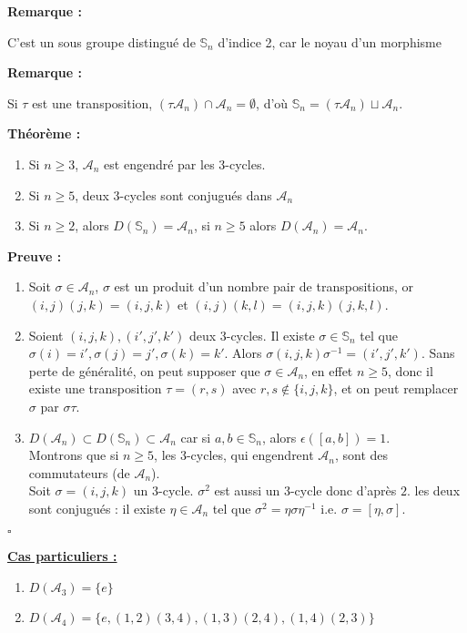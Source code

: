 \documentclass{report}
\renewenvironment{leftbar}{%
  \def\FrameCommand{\vrule width 0.4pt \hspace{10pt}}%
  \MakeFramed {\advance\hsize-\width \FrameRestore}}%
 {\endMakeFramed}%
\newenvironment{preuve}{\vspace*{0.5cm}
    \begin{leftbar}
    \noindent\textbf{Preuve :}\par}{
    \begin{flushright}
    $\square$
    \end{flushright}
    \end{leftbar}
}
\newenvironment{theoreme}[1][]{
    \begin{tcolorbox}[]
    \textbf{Théorème :} #1  \par} 
    {\end{tcolorbox}}
\newcommand{\remarque}{
    \noindent\textbf{Remarque :} \par
}
\newcommand{\sn}{\mathbb{S}_n}
\newcommand{\an}{\mathcal{A}_{n}}
\begin{document}
\remarque{C'est un sous groupe distingué de $\sn$ d'indice 2, car le noyau d'un morphisme}


\remarque{Si $\tau$ est une transposition, $(\tau\an)\cap\an=\emptyset$, d'où $\sn=(\tau\an)\sqcup\an$.}
\begin{theoreme}
\begin{enumerate}
\item Si $n\geq3$, $\an$ est engendré par les 3-cycles.
\item Si $n\geq5$, deux 3-cycles sont conjugués dans $\an$ 
\item Si $n\geq2$, alors $D(\sn)=\an$, si $n\geq5$ alors $D(\an)=\an$.
\end{enumerate}
\end{theoreme}

\begin{preuve}
\begin{enumerate}
\item Soit $\sigma\in\an$, $\sigma$ est un produit d'un nombre pair de transpositions, or $(i,j)(j,k)=(i,j,k)$ et $(i,j)(k,l)=(i,j,k)(j,k,l)$.
\item Soient $(i,j,k),(i',j',k')$ deux 3-cycles. Il existe $\sigma\in\sn$ tel que $\sigma(i)=i', \sigma(j)=j', \sigma(k)=k'$. Alors $\sigma(i,j,k)\sigma^{-1}=(i',j',k')$. 
Sans perte de généralité, on peut supposer que $\sigma\in\an$, en effet $n\geq5$, donc il existe une transposition $\tau=(r,s)$ avec $r,s\notin\{i,j,k\}$, et on peut remplacer $\sigma$ par $\sigma\tau$.
\item $D(\an)\subset D(\sn)\subset\an$ car si $a,b\in\sn$, alors $\epsilon([a,b])=1$.\\
Montrons que si $n\geq5$, les 3-cycles, qui engendrent $\an$, sont des commutateurs (de $\an$).\\
Soit $\sigma=(i,j,k)$ un 3-cycle. $\sigma^2$ est aussi un 3-cycle donc d'après $2.$ les deux sont conjugués : il existe $\eta\in\an$ tel que $\sigma^2=\eta\sigma\eta^{-1}$ i.e. $\sigma=[\eta,\sigma]$.
\end{enumerate}
\end{preuve}

\noindent\underline{\textbf{Cas particuliers :}}
\begin{enumerate}
\item $D(\mathcal{A}_3)=\{e\}$
\item $D(\mathcal{A}_4)=\{e,(1,2)(3,4),(1,3)(2,4),(1,4)(2,3)\}$
\end{enumerate}
\end{document}
